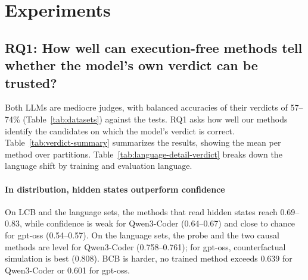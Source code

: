\section{Experiments}

\subsection{RQ1: How well can execution-free methods tell whether the model's own verdict can be trusted? }
\label{sec:rq-verdict}





Both LLMs are mediocre judges, with balanced accuracies of their verdicts of 57--74\% (Table~\ref{tab:datasets}) against the tests. RQ1 asks how well our methods identify the candidates on which the model's verdict is correct.
Table~\ref{tab:verdict-summary} summarizes the results, showing the mean per method over partitions.
Table~\ref{tab:language-detail-verdict} breaks down the language shift by training and evaluation language.

\paragraph{In distribution, hidden states outperform confidence}
On LCB and the language sets, the methods that read hidden states reach 0.69--0.83, while confidence is weak for
Qwen3-Coder (0.64--0.67) and close to chance for gpt-oss (0.54--0.57). %
On the language sets, the probe and the two causal methods are
level for Qwen3-Coder (0.758--0.761); for gpt-oss, counterfactual simulation is best (0.808). BCB is harder, no trained method exceeds 0.639 for Qwen3-Coder or 0.601 for gpt-oss.

